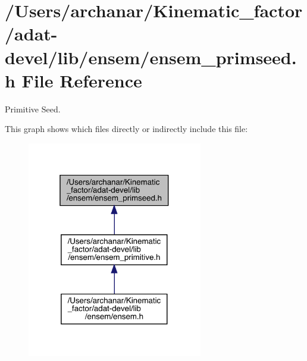 \hypertarget{adat-devel_2lib_2ensem_2ensem__primseed_8h}{}\section{/\+Users/archanar/\+Kinematic\+\_\+factor/adat-\/devel/lib/ensem/ensem\+\_\+primseed.h File Reference}
\label{adat-devel_2lib_2ensem_2ensem__primseed_8h}


Primitive Seed.  


This graph shows which files directly or indirectly include this file\+:
\nopagebreak
\begin{figure}[H]
\begin{center}
\leavevmode
\includegraphics[width=217pt]{da/d1e/adat-devel_2lib_2ensem_2ensem__primseed_8h__dep__incl}
\end{center}
\end{figure}
